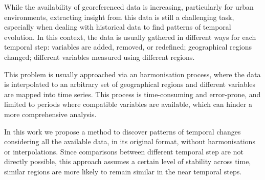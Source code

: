 While the availability of georeferenced data is increasing, particularly for
urban environments, extracting insight from this data is still a challenging
task, especially when dealing with historical data to find patterns of temporal
evolution. In this context, the data is usually gathered in different ways for
each temporal step: variables are added, removed, or redefined; geographical
regions changed; different variables measured using different regions.

This problem is usually approached via an harmonisation process, where the data
is interpolated to an arbitrary set of geographical regions and different
variables are mapped into time series. This process is time-consuming and
error-prone, and limited to periods where compatible variables are available,
which can hinder a more comprehensive analysis.

In this work we propose a method to discover patterns of temporal changes
considering all the available data, in its original format, without
harmonisations or interpolations. Since comparisons between different temporal
step are not directly possible, this approach assumes a certain level of
stability across time, similar regions are more likely to remain similar in the
near temporal steps.